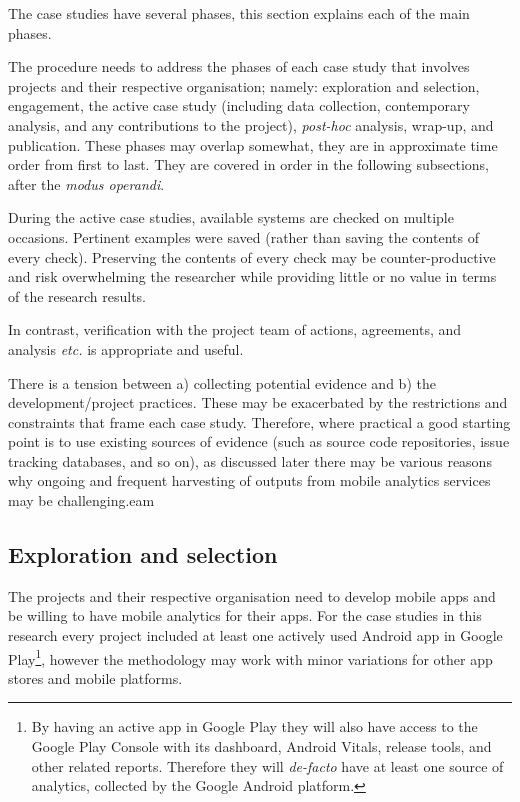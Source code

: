 The case studies have several phases, this section explains each of the main phases.

The procedure needs to address the phases of each case study that involves projects and their respective organisation; namely: exploration and selection, engagement, the active case study (including data collection, contemporary analysis, and any contributions to the project), \emph{post-hoc} analysis, wrap-up, and publication. These phases may overlap somewhat, they are in approximate time order from first to last. They are covered in order in the following subsections, after the \emph{modus operandi}.

During the active case studies, available systems are checked on multiple occasions. Pertinent examples were saved (rather than saving the contents of every check). Preserving the contents of every check may be counter-productive and risk overwhelming the researcher while providing little or no value in terms of the research results. 

In contrast, verification with the project team of actions, agreements, and analysis \emph{etc.} is appropriate and useful.

There is a tension between a) collecting potential evidence and b) the development/project practices. These may be exacerbated by the restrictions and constraints that frame each case study. Therefore, where practical a good starting point is to use existing sources of evidence (such as source code repositories, issue tracking databases, and so on), as discussed later there may be various reasons why ongoing and frequent harvesting of outputs from mobile analytics services may be challenging.eam

\subsection{Exploration and selection}
The projects and their respective organisation need to develop mobile apps and be willing to have mobile analytics for their apps. For the case studies in this research every project included at least one actively used Android app in Google Play\footnote{By having an active app in Google Play they will also have access to the Google Play Console with its dashboard, Android Vitals, release tools, and other related reports. Therefore they will \emph{de-facto} have at least one source of analytics, collected by the Google Android platform.}, however the methodology may work with minor variations for other app stores and mobile platforms.

